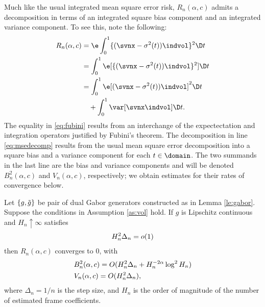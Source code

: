Much like the usual integrated mean square error risk, $R_n(\alpha,c)$ admits a decomposition in terms of an integrated square bias component and an integrated variance component. To see this, note the following:
\begin{align}
  R_n(\alpha, c ) & = \e \int_0^1  \{(\svnx - \sigma^2(t))\indvol\}^2 \D t \\ 
  & = \int_0^1 \e[ \{(\svnx - \sigma^2(t))\indvol\}^2] \D t \label{eq:fubini}\\ 
& = \int_0^1 \e[ (\svnx - \sigma^2(t))\indvol]^2 \D t \notag \\
& \quad + \int_0^1 \var[\svnx\indvol] \D t. \label{eq:msedecomp}
\end{align}
The equality in \eqref{eq:fubini} results from an interchange of the expectectation and integration operators justified by Fubini's theorem. The decomposition in line  \eqref{eq:msedecomp} results from the usual mean square error decomposition  into a square bias and a variance component for each  $t \in \domain$. The two summands in the last line are the bias and variance components and will be denoted $B_n^2(\alpha,c)$ and $V_n(\alpha,c)$, respectively; we obtain estimates for their rates of convergence below.
\begin{prop} \label{pr:consistency}
  Let $\{g, \tilde{g}\}$ be pair of dual Gabor generators constructed as in Lemma \eqref{le:gabor}.   Suppose the conditions in  Assumption \eqref{as:vol}  hold. If $g$ is Lipschitz continuous and $H_n \uparrow \infty$ satisfies  
  \begin{align}
    H_n^2 \Delta_n  = o(1) \notag
    \label{}
  \end{align}
   then $R_n(\alpha,c)$ converges to 0, with 
  \begin{align}
    & B_n^2(\alpha,c)  = O(H_n^2\Delta_n  + H_n^{-2\alpha} \log^2 H_n)\notag \\
    & V_n(\alpha,c)  = O(H_n^2 \Delta_n),
    \label{}
  \end{align}
  where  $\Delta_n = 1/n$ is the step size, and $H_n$ is the order of magnitude of the number of estimated frame coefficients. 
\end{prop}
